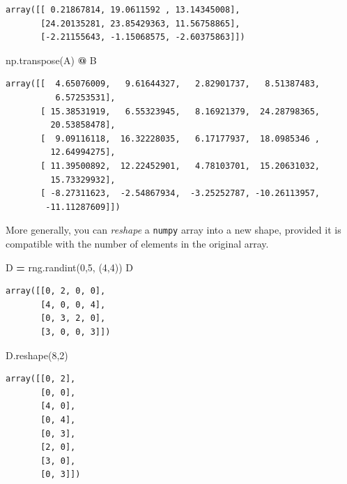 \documentclass[
  letterpaper,
]{scrbook}
\newenvironment{Shaded}{\begin{snugshade}}{\end{snugshade}}
\newcommand{\DecValTok}[1]{\textcolor[rgb]{0.00,0.00,0.81}{#1}}
\newcommand{\NormalTok}[1]{#1}
\newcommand{\OperatorTok}[1]{\textcolor[rgb]{0.81,0.36,0.00}{\textbf{#1}}}
\begin{document}
\begin{verbatim}
array([[ 0.21867814, 19.0611592 , 13.14345008],
       [24.20135281, 23.85429363, 11.56758865],
       [-2.21155643, -1.15068575, -2.60375863]])
\end{verbatim}

\begin{Shaded}
\begin{Highlighting}[]
\NormalTok{np.transpose(A) }\OperatorTok{@}\NormalTok{ B}
\end{Highlighting}
\end{Shaded}

\begin{verbatim}
array([[  4.65076009,   9.61644327,   2.82901737,   8.51387483,
          6.57253531],
       [ 15.38531919,   6.55323945,   8.16921379,  24.28798365,
         20.53858478],
       [  9.09116118,  16.32228035,   6.17177937,  18.0985346 ,
         12.64994275],
       [ 11.39500892,  12.22452901,   4.78103701,  15.20631032,
         15.73329932],
       [ -8.27311623,  -2.54867934,  -3.25252787, -10.26113957,
        -11.11287609]])
\end{verbatim}

More generally, you can \emph{reshape} a \texttt{numpy} array into a new shape, provided it is compatible with the number of elements in the original array.

\begin{Shaded}
\begin{Highlighting}[]
\NormalTok{D }\OperatorTok{=}\NormalTok{ rng.randint(}\DecValTok{0}\NormalTok{,}\DecValTok{5}\NormalTok{, (}\DecValTok{4}\NormalTok{,}\DecValTok{4}\NormalTok{))}
\NormalTok{D}
\end{Highlighting}
\end{Shaded}

\begin{verbatim}
array([[0, 2, 0, 0],
       [4, 0, 0, 4],
       [0, 3, 2, 0],
       [3, 0, 0, 3]])
\end{verbatim}

\begin{Shaded}
\begin{Highlighting}[]
\NormalTok{D.reshape(}\DecValTok{8}\NormalTok{,}\DecValTok{2}\NormalTok{)}
\end{Highlighting}
\end{Shaded}

\begin{verbatim}
array([[0, 2],
       [0, 0],
       [4, 0],
       [0, 4],
       [0, 3],
       [2, 0],
       [3, 0],
       [0, 3]])
\end{verbatim}
\end{document}

